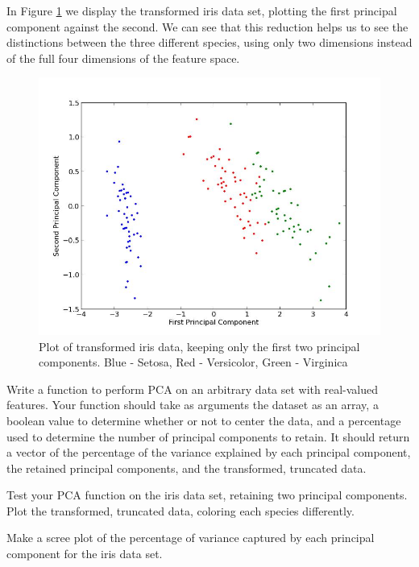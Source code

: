 In Figure \ref{fig:irispca} we display the transformed iris data set, plotting the first principal component against the second. We can see that this reduction helps us to see the distinctions between the three different species, using only two dimensions instead of the full four dimensions of the feature space.
\begin{figure}
\centering
\includegraphics[width=\textwidth]{irispca.jpg}
\caption{Plot of transformed iris data, keeping only the first two principal components. Blue - Setosa, Red - Versicolor, Green - Virginica}
\label{fig:irispca}
\end{figure}

\begin{problem}
Write a function to perform PCA on an arbitrary data set with real-valued features. Your function should take as arguments the dataset as an array, a boolean value to determine whether or not to center the data, and a percentage used to determine the number of principal components to retain. It should return a vector of the percentage of the variance explained by each principal component, the retained principal components, and the transformed, truncated data.
\end{problem}

\begin{problem}
Test your PCA function on the iris data set, retaining two principal components. Plot the transformed, truncated data, coloring each species differently.
\end{problem}

\begin{problem}
Make a scree plot of the percentage of variance captured by each principal component for the iris data set.
\end{problem}